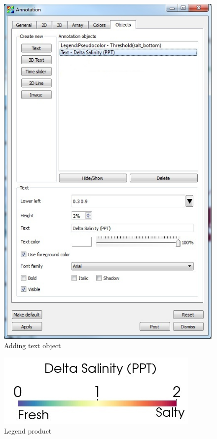 \documentclass[12pt]{report}
\begin{document}
				\begin{figure}
        \begin{center}
        \includegraphics{textObject}
        \caption{Adding text object}
        \label{figure:textObject}
        \end{center}
        \end{figure} 
				
				
				\begin{figure}
        \begin{center}
        \includegraphics{legendProduct}
        \caption{Legend product}
        \label{figure:legendProduct}
        \end{center}
        \end{figure} 
			
\end{document}
